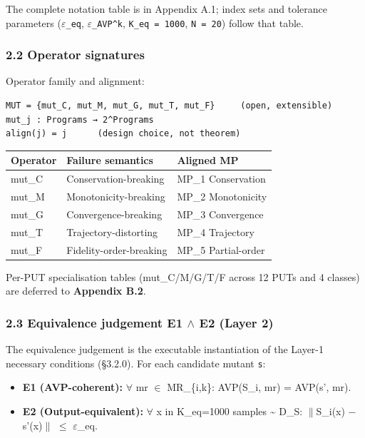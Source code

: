 \documentclass[review,12pt,authoryear]{elsarticle}
\providecommand{\tightlist}{\setlength{\itemsep}{0pt}\setlength{\parskip}{0pt}}
\newcounter{none}                   %
\begin{document}
The complete notation table is in Appendix A.1; index sets and tolerance
parameters (\texttt{$\varepsilon$\_eq}, \texttt{$\varepsilon$\_AVP\^{}k},
\texttt{K\_eq\ =\ 1000}, \texttt{N\ =\ 20}) follow that table.

\subsubsection{2.2 Operator signatures}\label{operator-signatures}

Operator family and alignment:

\begin{verbatim}
MUT = {mut_C, mut_M, mut_G, mut_T, mut_F}     (open, extensible)
mut_j : Programs → 2^Programs
align(j) = j      (design choice, not theorem)
\end{verbatim}

{\def\LTcaptype{none} %
\begin{longtable}[]{@{}lll@{}}
\toprule\noalign{}
Operator & Failure semantics & Aligned MP \\
\midrule\noalign{}
\endhead
\bottomrule\noalign{}
\endlastfoot
mut\_C & Conservation-breaking & MP\_1 Conservation \\
mut\_M & Monotonicity-breaking & MP\_2 Monotonicity \\
mut\_G & Convergence-breaking & MP\_3 Convergence \\
mut\_T & Trajectory-distorting & MP\_4 Trajectory \\
mut\_F & Fidelity-order-breaking & MP\_5 Partial-order \\
\end{longtable}
}

Per-PUT specialisation tables (mut\_C/M/G/T/F across 12 PUTs and 4
classes) are deferred to \textbf{Appendix B.2}.

\subsubsection{2.3 Equivalence judgement E1 $\wedge$ E2 (Layer
2)}\label{equivalence-judgement-e1-e2-layer-2}

The equivalence judgement is the executable instantiation of the Layer-1
necessary conditions (§3.2.0). For each candidate mutant
\texttt{s\textquotesingle{}}:

\begin{itemize}
\tightlist
\item
  \textbf{E1 (AVP-coherent):} $\forall$ mr $\in$ MR\_\{i,k\}: AVP(S\_i, mr) =
  AVP(s', mr).
\item
  \textbf{E2 (Output-equivalent):} $\forall$ x in K\_eq=1000 samples
  \textasciitilde{} D\_S: $\|$S\_i(x) − s'(x)$\|$ $\leq$ $\varepsilon$\_eq.
\end{itemize}
\end{document}
